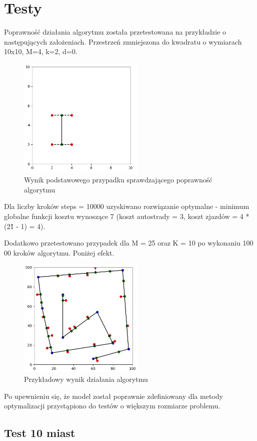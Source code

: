 \documentclass[a4paper]{article}
\begin{document}
\section{Testy}
Poprawność działania algorytmu została przetestowana na przykładzie o następujących założeniach. Przestrzeń zmniejszona do kwadratu o wymiarach 10x10, M=4, k=2, d=0.
\begin{figure}[h!]
\centering
\includegraphics[width=6cm]{test}
\caption{Wynik podstawowego przypadku sprawdzającego poprawność algorytmu}
\end{figure}\newline
Dla liczby kroków steps = 10000 uzyskiwano rozwiązanie optymalne - minimum globalne funkcji kosztu wynoszące 7 (koszt autostrady = 3, koszt zjazdów = 4 * (2\^1 - 1) = 4).\newline

Dodatkowo przetestowano przypadek dla M = 25 oraz K = 10 po wykonaniu 100 00 kroków algorytmu. Poniżej efekt.
\begin{figure}[h!]
\centering
\includegraphics[width=6cm]{test2}
\caption{Przykładowy wynik działania algorytmu}
\end{figure}\newline
Po upewnieniu się, że model został poprawnie zdefiniowany dla metody optymalizacji przystąpiono do testów o większym rozmiarze problemu.

\subsection{Test 10 miast}
\end{document}
